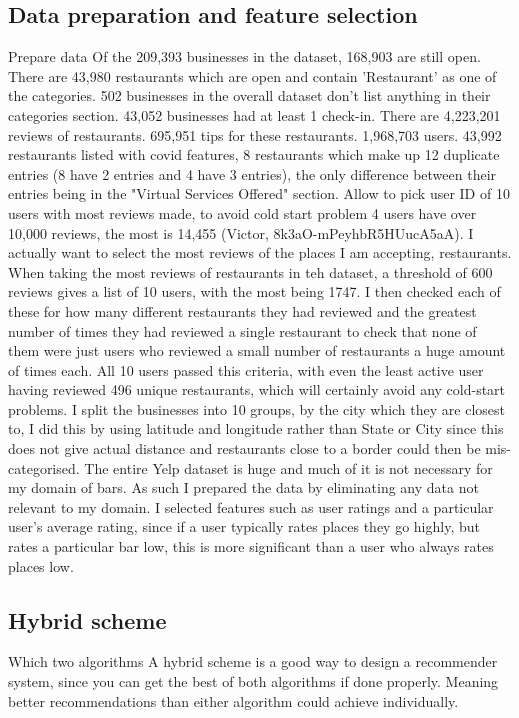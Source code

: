 \documentclass[conference]{IEEEtran}
\begin{document}
\subsection{Data preparation and feature selection}
Prepare data
Of the 209,393 businesses in the dataset, 168,903 are still open. 
There are 43,980 restaurants which are open and contain 'Restaurant' as one of the categories. 
502 businesses in the overall dataset don't list anything in their categories section. 
43,052 businesses had at least 1 check-in. 
There are 4,223,201 reviews of restaurants. 
695,951 tips for these restaurants. 
1,968,703 users. 
43,992 restaurants listed with covid features, 8 restaurants which make up 12 duplicate entries 
(8 have 2 entries and 4 have 3 entries), the only difference between their entries being in the 
"Virtual Services Offered" section. 
Allow to pick user ID of 10 users with most reviews made, to avoid cold start problem
4 users have over 10,000 reviews, the most is 14,455 (Victor, 8k3aO-mPeyhbR5HUucA5aA). 
I actually want to select the most reviews of the places I am accepting, restaurants. 
When taking the most reviews of restaurants in teh dataset, a threshold of 600 reviews gives a list of 10 users, 
with the most being 1747. 
I then checked each of these for how many different restaurants they had reviewed and the greatest number of times 
they had reviewed a single restaurant to check that none of them were just users who reviewed a small number of 
restaurants a huge amount of times each. 
All 10 users passed this criteria, with even the least active user having reviewed 496 unique restaurants, which will 
certainly avoid any cold-start problems. 
I split the businesses into 10 groups, by the city which they are closest to, I did this by using latitude and 
longitude rather than State or City since this does not give actual distance and restaurants close to a border 
could then be mis-categorised. 
The entire Yelp dataset is huge and much of it is not necessary for my domain of bars.
As such I prepared the data by eliminating any data not relevant to my domain.
I selected features such as user ratings and a particular user's average rating,
since if a user typically rates places they go highly, but rates a particular bar low,
this is more significant than a user who always rates places low.

\subsection{Hybrid scheme}
Which two algorithms
A hybrid scheme is a good way to design a recommender system, since you can get the
best of both algorithms if done properly.
Meaning better recommendations than either algorithm could achieve individually.
\end{document}
